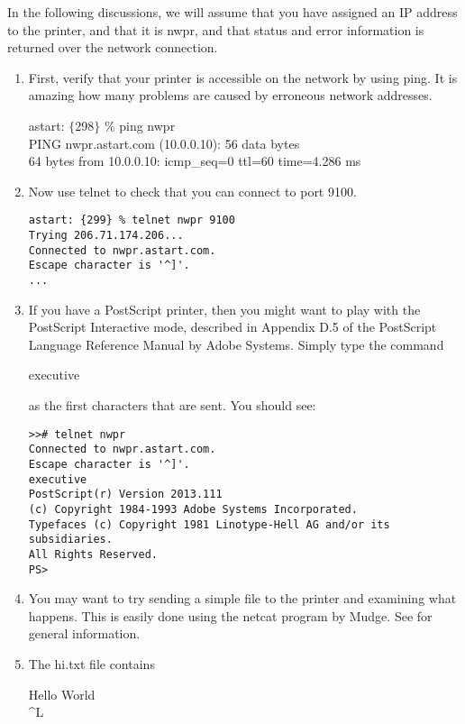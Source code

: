 \documentclass[a4paper]{article}
\begin{document}
In the following discussions,
we will assume that you have assigned an IP address to the printer,
and that it is {\ttfamily nwpr},
and that status and error information is returned over the network
connection.
\begin{enumerate}
\item First,
verify that your printer is accessible on the network by using
{\ttfamily ping}.
It is amazing how many problems are caused by erroneous
network addresses.
\begin{tscreen}
astart: $\{$298$\}$ \% ping nwpr \\ 
PING nwpr.astart.com (10.0.0.10): 56 data bytes \\ 
64 bytes from 10.0.0.10: icmp\_seq=0 ttl=60 time=4.286 ms 
\end{tscreen}
\item Now use
{\ttfamily telnet}
to check that you can connect to port 9100.
\begin{tscreen}
\begin{verbatim}
astart: {299} % telnet nwpr 9100
Trying 206.71.174.206...
Connected to nwpr.astart.com.
Escape character is '^]'.
...
\end{verbatim}
\end{tscreen}
\item If you have a PostScript printer,
then you might want to play with the PostScript Interactive mode,
described in
Appendix D.5 of the PostScript Language Reference Manual
by Adobe Systems.
Simply type the command
\begin{tscreen}
executive
\end{tscreen}

as the first characters that are sent.
You should see:
\begin{tscreen}
\begin{verbatim}
>># telnet nwpr
Connected to nwpr.astart.com.
Escape character is '^]'.
executive
PostScript(r) Version 2013.111
(c) Copyright 1984-1993 Adobe Systems Incorporated.
Typefaces (c) Copyright 1981 Linotype-Hell AG and/or its subsidiaries.
All Rights Reserved.
PS>
\end{verbatim}
\end{tscreen}
\item You may want to try sending a simple file to the printer
and examining what happens.
This is easily done using the
{\ttfamily netcat}
program  by Mudge.
See
for general information.
\item The
{\ttfamily hi.txt}
file contains
\begin{tscreen}
Hello World \\ 
\^{}L 
\end{tscreen}


\end{enumerate}
\end{document}
